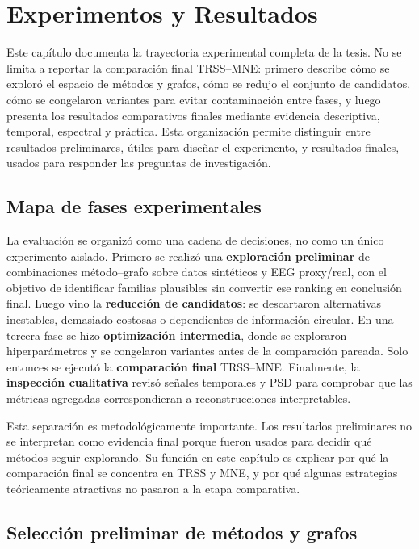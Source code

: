 \chapter{Experimentos y Resultados}
\label{ch:resultados}

Este capítulo documenta la trayectoria experimental completa de la tesis. No se limita a reportar la comparación final TRSS--MNE: primero describe cómo se exploró el espacio de métodos y grafos, cómo se redujo el conjunto de candidatos, cómo se congelaron variantes para evitar contaminación entre fases, y luego presenta los resultados comparativos finales mediante evidencia descriptiva, temporal, espectral y práctica. Esta organización permite distinguir entre resultados preliminares, útiles para diseñar el experimento, y resultados finales, usados para responder las preguntas de investigación.

\section{Mapa de fases experimentales}

La evaluación se organizó como una cadena de decisiones, no como un único experimento aislado. Primero se realizó una \textbf{exploración preliminar} de combinaciones método--grafo sobre datos sintéticos y EEG proxy/real, con el objetivo de identificar familias plausibles sin convertir ese ranking en conclusión final. Luego vino la \textbf{reducción de candidatos}: se descartaron alternativas inestables, demasiado costosas o dependientes de información circular. En una tercera fase se hizo \textbf{optimización intermedia}, donde se exploraron hiperparámetros y se congelaron variantes antes de la comparación pareada. Solo entonces se ejecutó la \textbf{comparación final} TRSS--MNE. Finalmente, la \textbf{inspección cualitativa} revisó señales temporales y PSD para comprobar que las métricas agregadas correspondieran a reconstrucciones interpretables.

Esta separación es metodológicamente importante. Los resultados preliminares no se interpretan como evidencia final porque fueron usados para decidir qué métodos seguir explorando. Su función en este capítulo es explicar por qué la comparación final se concentra en TRSS y MNE, y por qué algunas estrategias teóricamente atractivas no pasaron a la etapa comparativa.

\section{Selección preliminar de métodos y grafos}

